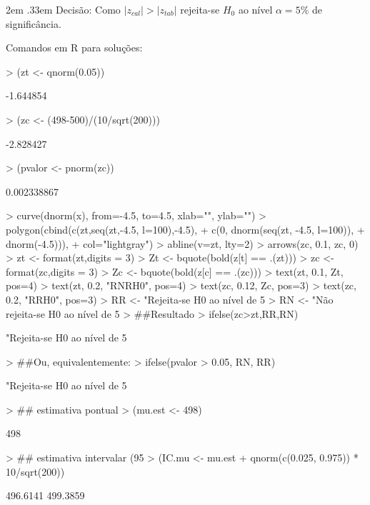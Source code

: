 \documentclass{article}
\newenvironment{ManualExercise}
  {\begin{list}{}{\leftmargin \QuestionIndent
    \partopsep0pt \parsep\parskip \topsep\QuestionBefore
    \itemsep\QuestionBefore \labelwidth2em
    \labelsep.33em
    \usecounter{Question}}}
  {\end{list}}
\begin{document}
\begin{Exercise}
\begin{ManualExercise}
Decisão: Como $|z_{cal}|>|z_{tab}|$ rejeita-se $H_{0}$ ao nível $\alpha=5\%$ de significância.

Comandos em R para soluções:

\begin{Schunk}
\begin{Sinput}
> (zt <- qnorm(0.05))
\end{Sinput}
\begin{Soutput}
[1] -1.644854
\end{Soutput}
\begin{Sinput}
> (zc <- (498-500)/(10/sqrt(200)))
\end{Sinput}
\begin{Soutput}
[1] -2.828427
\end{Soutput}
\begin{Sinput}
> (pvalor <- pnorm(zc))
\end{Sinput}
\begin{Soutput}
[1] 0.002338867
\end{Soutput}
\begin{Sinput}
> curve(dnorm(x), from=-4.5, to=4.5, xlab="", ylab="")
> polygon(cbind(c(zt,seq(zt,-4.5, l=100),-4.5), 
+               c(0, dnorm(seq(zt, -4.5, l=100)), 
+                 dnorm(-4.5))), 
+         col="lightgray")
> abline(v=zt, lty=2)
> arrows(zc, 0.1, zc, 0)
> zt <- format(zt,digits = 3)
> Zt <- bquote(bold(z[t] == .(zt)))
> zc <- format(zc,digits = 3)
> Zc <- bquote(bold(z[c] == .(zc)))
> text(zt, 0.1, Zt, pos=4)
> text(zt, 0.2, "RNRH0", pos=4)
> text(zc, 0.12, Zc, pos=3)
> text(zc, 0.2, "RRH0", pos=3)
> RR <- "Rejeita-se H0 ao nível de 5%
> RN <- "Não rejeita-se H0 ao nível de 5%
> ##Resultado
> ifelse(zc>zt,RR,RN)
\end{Sinput}
\begin{Soutput}
[1] "Rejeita-se H0 ao nível de 5%
\end{Soutput}
\begin{Sinput}
> ##Ou, equivalentemente:
> ifelse(pvalor > 0.05, RN, RR)
\end{Sinput}
\begin{Soutput}
[1] "Rejeita-se H0 ao nível de 5%
\end{Soutput}
\begin{Sinput}
> ## estimativa pontual
> (mu.est <- 498)
\end{Sinput}
\begin{Soutput}
[1] 498
\end{Soutput}
\begin{Sinput}
> ## estimativa intervalar (95%
> (IC.mu <- mu.est + qnorm(c(0.025, 0.975)) * 10/sqrt(200))
\end{Sinput}
\begin{Soutput}
[1] 496.6141 499.3859
\end{Soutput}
\end{Schunk}



\end{ManualExercise}
\end{Exercise}
\end{document}

